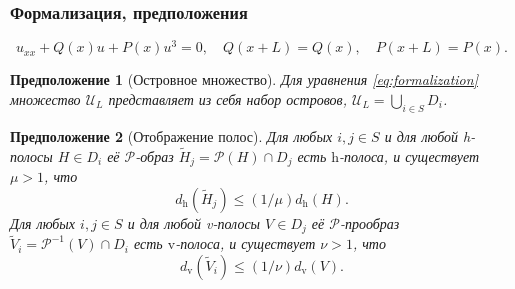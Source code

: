 \documentclass [10pt] {beamer}
\newtheorem{hypothesis}{Предположение}
\begin{document}
\begin{frame}
	\frametitle{Формализация, предположения}
	
	\begin{equation}
		u_{xx} + Q(x) u + P(x) u^3 = 0, \quad Q(x + L) = Q(x), \quad P(x + L) = P(x).
		\label{eq:formalization}
	\end{equation}
	
	\begin{hypothesis}[Островное множество]
		Для уравнения \eqref{eq:formalization} множество $\mathscr{U}_L$ представляет из себя набор островов, $\mathscr{U}_L = \bigcup_{i \in S} D_i$.
	\end{hypothesis}

	\begin{hypothesis}[Отображение полос]
		Для любых $i, j \in S$ и для любой h-полосы $H \in D_i$ её $\mathcal{P}$-образ $\widetilde{H}_j = \mathcal{P}(H) \cap D_j$ есть $\mathrm{h}$-полоса, и существует $\mu > 1$, что
		\begin{equation}
			d_{\mathrm{h}}(\widetilde{H}_j) \le (1/\mu) d_{\mathrm{h}}(H).
		\end{equation}
		Для любых $i, j \in S$ и для любой v-полосы $V \in D_j$ её $\mathcal{P}$-прообраз $\widetilde{V}_i = \mathcal{P}^{-1}(V) \cap D_i$ есть $\mathrm{v}$-полоса, и существует $\nu > 1$, что
		\begin{equation}
			d_{\mathrm{v}}(\widetilde{V}_i) \le (1/\nu) d_{\mathrm{v}}(V).
		\end{equation}
	\end{hypothesis}
\end{frame}
\end{document}
